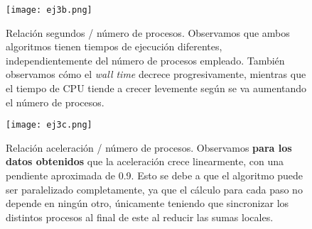 \begin{figure}[H]
    \centering
    \texttt{[image: ej3b.png]}
    \caption{Relación segundos / número de procesos. Observamos que ambos algoritmos tienen tiempos de ejecución
    diferentes, independientemente del número de procesos empleado. También observamos cómo el \textit{wall time}
    decrece progresivamente, mientras que el tiempo de CPU tiende a crecer levemente según se va
    aumentando el número de procesos.}
\end{figure}

\begin{figure}[H]
    \centering
    \texttt{[image: ej3c.png]}
    \caption{Relación aceleración / número de procesos. Observamos \textbf{para los datos obtenidos} que la aceleración crece linearmente, con una pendiente
    aproximada de 0.9. Esto se debe a que el algoritmo puede ser paralelizado completamente, ya que el cálculo para cada paso
    no depende en ningún otro, únicamente teniendo que sincronizar los distintos procesos al final de este al reducir las sumas locales.}
\end{figure}
